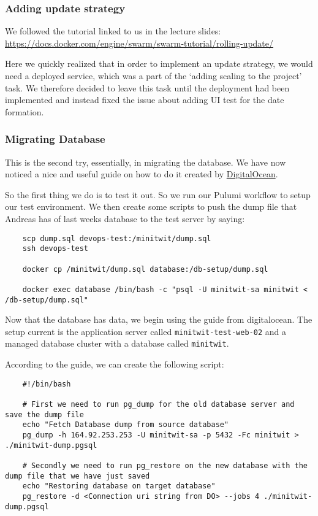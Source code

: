 \subsubsection{Adding update strategy}
\label{log:adding-update-strategy}

We followed the tutorial linked to us in the lecture slides: \url{https://docs.docker.com/engine/swarm/swarm-tutorial/rolling-update/}

Here we quickly realized that in order to implement an update strategy, we would need a deployed service, which was a part of the `adding scaling to the project' task. We therefore decided to leave this task until the deployment had been implemented and instead fixed the issue about adding UI test for the date formation.

\subsubsection{Migrating Database}
\label{log:migrating-database}

This is the second try, essentially, in migrating the database. We have now noticed a nice and useful guide on how to do it created by \href{https://docs.digitalocean.com/products/databases/postgresql/how-to/import-databases/}{DigitalOcean}.

So the first thing we do is to test it out. So we run our Pulumi workflow to setup our test environment. We then create some scripts to push the dump file that Andreas has of last weeks database to the test server by saying:
\begin{verbatim}
    scp dump.sql devops-test:/minitwit/dump.sql
    ssh devops-test

    docker cp /minitwit/dump.sql database:/db-setup/dump.sql

    docker exec database /bin/bash -c "psql -U minitwit-sa minitwit < /db-setup/dump.sql"
\end{verbatim}

Now that the database has data, we begin using the guide from digitalocean. The setup current is the application server called \texttt{minitwit-test-web-02} and a managed database cluster with a database called \texttt{minitwit}.

According to the guide, we can create the following script:

\begin{verbatim}
    #!/bin/bash

    # First we need to run pg_dump for the old database server and save the dump file
    echo "Fetch Database dump from source database"
    pg_dump -h 164.92.253.253 -U minitwit-sa -p 5432 -Fc minitwit > ./minitwit-dump.pgsql

    # Secondly we need to run pg_restore on the new database with the dump file that we have just saved
    echo "Restoring database on target database"
    pg_restore -d <Connection uri string from DO> --jobs 4 ./minitwit-dump.pgsql
\end{verbatim}


